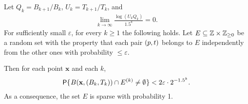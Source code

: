 \documentclass[12pt]{memoir}
\renewcommand{\le}{\leq}
\renewcommand{\ge}{\geq}
\renewcommand{\vek}[1]{\mathbf{#1}}
\def\B{B}
\def\U{U}
\newcommand{\Q}{Q}
\newcommand{\Tu}{T}
\begin{document}
\begin{lemma}[Sparsity]\label{lem:sparsiness}
Let \( \Q_{k} = \B_{k+1}/\B_{k} \), \( \U_{k} = \Tu_{k+1}/\Tu_{k} \), and
\begin{align}\label{eq:assumption}
  \lim_{k\rightarrow\infty}\frac{\log(\U_{k} \Q_{k})}{1.5^k}=0.
\end{align}
For sufficiently small \( \varepsilon \), for every \( k\ge 1 \) the following holds.
Let \( E\subseteq \bbZ\times \bbZ_{\ge 0} \)
be a random set with the property that each pair \( (p,t) \) belongs to \( E \)
independently from the other ones with probability \( \le \varepsilon \).

Then for each point \( \vek{x} \)  and each \( k \),
 \begin{align*}
   \Pbof{B(\vek{x},(\B_{k}, \Tu_{k}))\cap E^{(k)}\neq\emptyset} <2\varepsilon \cdot 2^{-1.5^{k}}.
 \end{align*}
As a consequence, the set \( E \) is sparse with probability 1.
\end{lemma}
\end{document}

